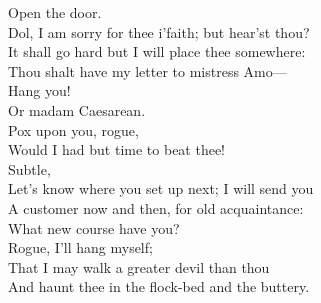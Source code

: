 \documentclass[a4paper,oneside,12pt]{memoir}
\begin{document}
\begin{drama*}
\mammonspeaks {} Open the door.\\
\facespeaks Dol, I am sorry for thee i'faith; but hear'st thou?\\
It shall go hard but I will place thee somewhere:\\
Thou shalt have my letter to mistress Amo---\\
\dolspeaks Hang you!\\
\facespeaks {} Or madam Caesarean.\\
\dolspeaks {} Pox upon you, rogue,\\
Would I had but time to beat thee!\\
\facespeaks {} Subtle,\\
Let's know where you set up next; I will send you\\
A customer now and then, for old acquaintance:\\
What new course have you?\\
\subtlespeaks {} Rogue, I'll hang myself;\\
That I may walk a greater devil than thou\\
And haunt thee in the flock-bed and the buttery.\\
\scene


\end{drama*}
\end{document}
